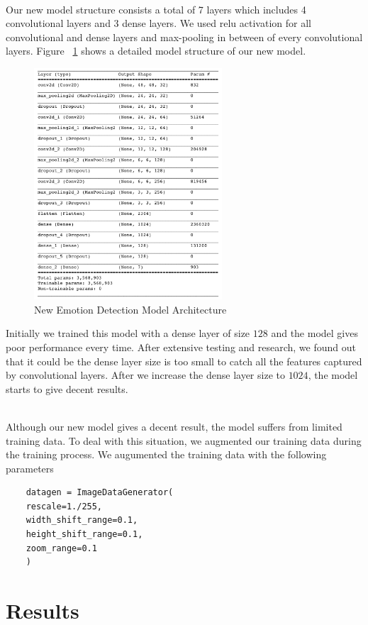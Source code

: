\documentclass[10pt,twocolumn,letterpaper]{article}
\begin{document}
\\
Our new model structure consists a total of 7 layers which includes 4 convolutional layers and 3 dense layers. We used relu activation for all convolutional and dense layers and max-pooling in between of every convolutional layers. Figure ~\ref{fig:simple_model} shows a detailed model structure of our new model.
\begin{figure}[h]
    \centering
    \includegraphics[width=7cm]{simple_model.png}
    \caption{New Emotion Detection Model Architecture}
    \label{fig:simple_model}
\end{figure}

Initially we trained this model with a dense layer of size $128$ and the model gives poor performance every time. After extensive testing and research, we found out that it could be the dense layer size is too small to catch all the features captured by convolutional layers. After we increase the dense layer size to $1024$, the model starts to give decent results.

\\
Although our new model gives a decent result, the model suffers from limited training data. To deal with this situation, we augmented our training data during the training process. We augumented the training data with the following parameters
\begin{verbatim}
    datagen = ImageDataGenerator(
    rescale=1./255,
    width_shift_range=0.1,
    height_shift_range=0.1,
    zoom_range=0.1
    )
\end{verbatim}



\section{Results}
\end{document}
